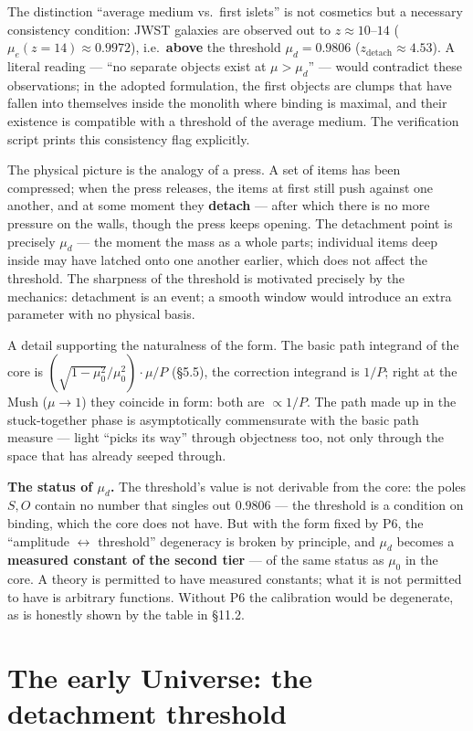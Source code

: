 \documentclass{article}
\begin{document}
The distinction ``average medium vs.\ first islets'' is not cosmetics but a necessary consistency condition: JWST galaxies are observed out to $z \approx 10\text{--}14$ ($\mu_e(z{=}14) \approx 0.9972$), i.e.\ \textbf{above} the threshold $\mu_d = 0.9806$ ($z_{\text{detach}} \approx 4.53$). A literal reading --- ``no separate objects exist at $\mu > \mu_d$'' --- would contradict these observations; in the adopted formulation, the first objects are clumps that have fallen into themselves inside the monolith where binding is maximal, and their existence is compatible with a threshold of the average medium. The verification script prints this consistency flag explicitly.

The physical picture is the analogy of a press. A set of items has been compressed; when the press releases, the items at first still push against one another, and at some moment they \textbf{detach} --- after which there is no more pressure on the walls, though the press keeps opening. The detachment point is precisely $\mu_d$ --- the moment the mass as a whole parts; individual items deep inside may have latched onto one another earlier, which does not affect the threshold. The sharpness of the threshold is motivated precisely by the mechanics: detachment is an event; a smooth window would introduce an extra parameter with no physical basis.

A detail supporting the naturalness of the form. The basic path integrand of the core is $(\sqrt{1-\mu_0^2}/\mu_0^2)\cdot\mu/P$ (\S5.5), the correction integrand is $1/P$; right at the Mush ($\mu \to 1$) they coincide in form: both are $\propto 1/P$. The path made up in the stuck-together phase is asymptotically commensurate with the basic path measure --- light ``picks its way'' through objectness too, not only through the space that has already seeped through.

\medskip
\noindent\textbf{The status of $\mu_d$.} The threshold's value is not derivable from the core: the poles $S, O$ contain no number that singles out $0.9806$ --- the threshold is a condition on binding, which the core does not have. But with the form fixed by P6, the ``amplitude $\leftrightarrow$ threshold'' degeneracy is broken by principle, and $\mu_d$ becomes a \textbf{measured constant of the second tier} --- of the same status as $\mu_0$ in the core. A theory is permitted to have measured constants; what it is not permitted to have is arbitrary functions. Without P6 the calibration would be degenerate, as is honestly shown by the table in \S11.2.
\section{The early Universe: the detachment threshold}
\end{document}
